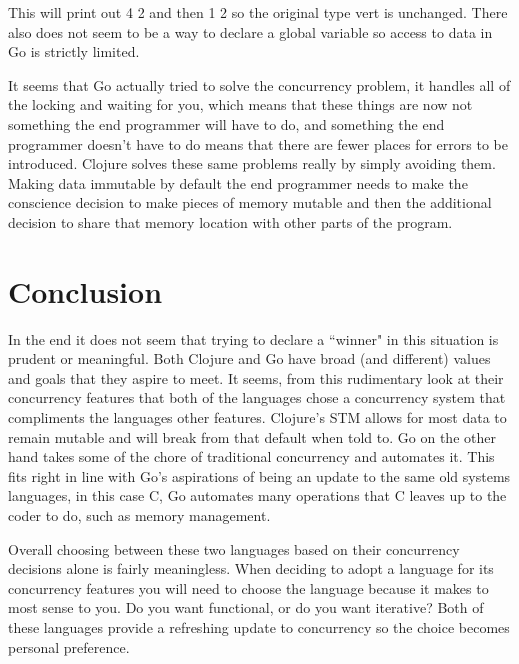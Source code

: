 \documentclass{acm_proc_article-sp}
\begin{document}
	This will print out {4 2} and then {1 2} so the original type vert is unchanged. There also does not seem to be a way to declare a global variable so access to data in Go is strictly limited.
	
	It seems that Go actually tried to solve the concurrency problem, it handles all of the locking and waiting for you, which means that these things are now not something the end programmer will have to do, and something the end programmer doesn't have to do means that there are fewer places for errors to be introduced. Clojure solves these same problems really by simply avoiding them. Making data immutable by default the end programmer needs to make the conscience decision to make pieces of memory mutable and then the additional decision to share that memory location with other parts of the program.
	
\section{Conclusion}
	In the end it does not seem that trying to declare a ``winner" in this situation is prudent or meaningful. Both Clojure and Go have broad (and different) values and goals that they aspire to meet. It seems, from this rudimentary look at their concurrency features that both of the languages chose a concurrency system that compliments the languages other features. Clojure's STM allows for most data to remain mutable and will break from that default when told to. Go on the other hand takes some of the chore of traditional concurrency and automates it. This fits right in line with Go's aspirations of being an update to the same old systems languages, in this case C, Go automates many operations that C leaves up to the coder to do, such as memory management. 
	
	Overall choosing between these two languages based on their concurrency decisions alone is fairly meaningless. When deciding to adopt a language for its concurrency features you will need to choose the language because it makes to most sense to you. Do you want functional, or do you want iterative? Both of these languages provide a refreshing update to concurrency so the choice becomes personal preference.



\end{document}
